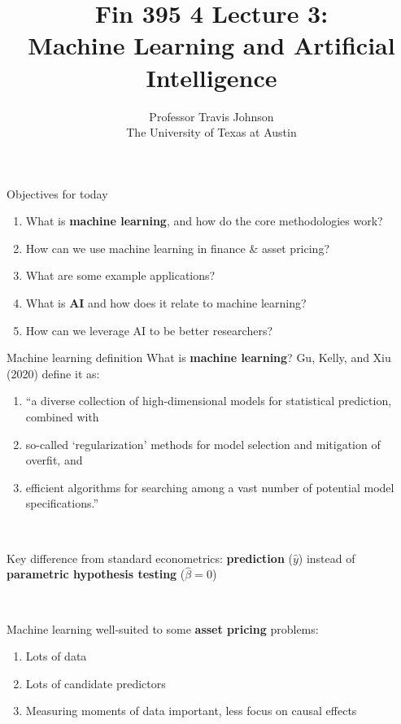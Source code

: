 \documentclass[xcolor=table, aspectratio=169]{beamer}
\title[Machine Learning and AI]{Fin 395 4 Lecture 3: \\ Machine Learning and Artificial Intelligence}
\author[Empirical Asset Pricing (Johnson)]{Professor Travis Johnson \\ The University of Texas at Austin}
\date{}
\newcommand{\alertbf}[1]{\alert{\textbf{#1}}}
\begin{document}
\begin{frame}
  \titlepage 
\end{frame}


\begin{frame}{Objectives for today}
    \begin{enumerate}
        \item What is \alertbf{machine learning}, and how do the core methodologies work?
        \item How can we use machine learning in finance \& asset pricing?
        \item What are some example applications? 
    \end{enumerate}

    \vspace{0.5cm}

    \begin{enumerate}
    \setcounter{enumi}{3}
        \item What is \alertbf{AI} and how does it relate to machine learning?
        \item How can we leverage AI to be better researchers?
    \end{enumerate}
\end{frame}

\begin{frame}{Machine learning definition}
    What is \alertbf{machine learning}? Gu, Kelly, and Xiu (2020) define it as:

    \begin{enumerate}
        \item {\small``a diverse collection of high-dimensional models for statistical prediction, combined with}
        \item {\small so-called `regularization' methods for model selection and mitigation of overfit, and}
        \item {\small efficient algorithms for searching among a vast number of potential model specifications.''}
    \end{enumerate}


    ~

    Key difference from standard econometrics: \alertbf{prediction} ($\hat{y}$) instead of \alertbf{parametric hypothesis testing} ($\hat{\beta}=0$)

    ~

    Machine learning well-suited to some \alertbf{asset pricing} problems:
    \begin{enumerate}
        \item Lots of data
        \item Lots of candidate predictors
        \item Measuring moments of data important, less focus on causal effects
    \end{enumerate}
\end{frame}
\end{document}
